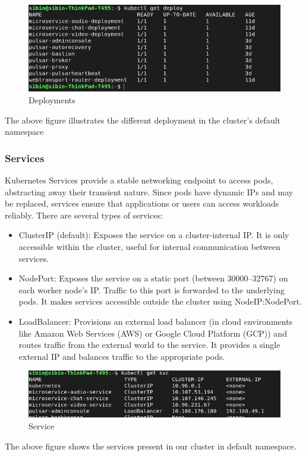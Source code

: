 \begin{figure}[H]
\caption{Deployments}
\centering
\includegraphics[width=1\textwidth]{SOA/k_deploy.png}
\end{figure}
The above figure illustrates the different deployment in the cluster's default namespace

\subsubsection{Services}
Kubernetes Services provide a stable networking endpoint to access pods, abstracting away their transient nature. Since pods have dynamic IPs and may be replaced, services ensure that applications or users can access workloads reliably. There are several types of services:

\begin{itemize}
    \item ClusterIP (default): Exposes the service on a cluster-internal IP. It is only accessible within the cluster, useful for internal communication between services.
    \item NodePort: Exposes the service on a static port (between 30000–32767) on each worker node's IP. Traffic to this port is forwarded to the underlying pods. It makes services accessible outside the cluster using  NodeIP:NodePort.
    \item LoadBalancer: Provisions an external load balancer (in cloud environments like Amazon Web Services (AWS) or Google Cloud Platform (GCP)) and routes traffic from the external world to the service. It provides a single external IP and balances traffic to the appropriate pods.
\end{itemize}

\begin{figure}[H]
\caption{Service}
\centering
\includegraphics[width=1\textwidth]{SOA/k_svc.png}
\end{figure}
The above figure shows the services present in our cluster in default namespace.


